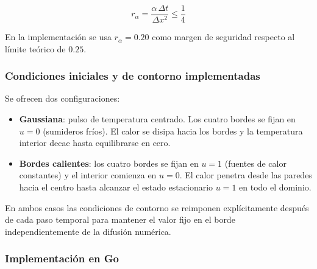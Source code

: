 \documentclass[12pt, a4paper]{article}
\begin{document}
\begin{equation}
    r_\alpha = \frac{\alpha\,\Delta t}{\Delta x^2} \leq \frac{1}{4}
    \label{eq:estab-calor}
\end{equation}

En la implementación se usa $r_\alpha = 0.20$ como margen de seguridad respecto al
límite teórico de $0.25$.

\subsubsection{Condiciones iniciales y de contorno implementadas}

Se ofrecen dos configuraciones:

\begin{itemize}
    \item \textbf{Gaussiana}: pulso de temperatura centrado. Los cuatro bordes se fijan
    en $u = 0$ (sumideros fríos). El calor se disipa hacia los bordes y la temperatura
    interior decae hasta equilibrarse en cero.

    \item \textbf{Bordes calientes}: los cuatro bordes se fijan en $u = 1$ (fuentes de
    calor constantes) y el interior comienza en $u = 0$. El calor penetra desde las
    paredes hacia el centro hasta alcanzar el estado estacionario $u = 1$ en todo el
    dominio.
\end{itemize}

En ambos casos las condiciones de contorno se reimponen explícitamente después de cada
paso temporal para mantener el valor fijo en el borde independientemente de la difusión
numérica.

\subsubsection{Implementación en Go}
\end{document}
